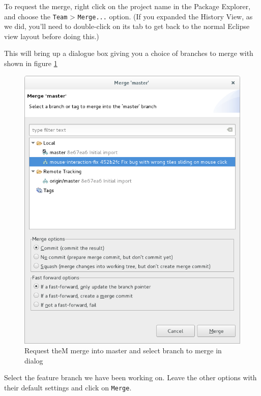 \documentclass[
]{book}
\begin{document}
To request the merge, right click on the project name in the Package Explorer, and choose the \texttt{Team} \textgreater{} \texttt{Merge...} option. (If you expanded the History View, as we did, you'll need to double-click on its tab to get back to the normal Eclipse view layout before doing this.)

This will bring up a dialogue box giving you a choice of branches to merge with shown in figure \ref{fig:requestTheMergeIntoMasterAndSelectbranchToMergeIn-fig}

\begin{figure}

{\centering \includegraphics[width=1\linewidth]{images/requestTheMergeIntoMasterAndSelectbranchToMergeIn} 

}

\caption{Request theM merge into master and select branch to merge in dialog}\label{fig:requestTheMergeIntoMasterAndSelectbranchToMergeIn-fig}
\end{figure}

Select the feature branch we have been working on. Leave the other options with their default settings and click on \texttt{Merge}.
\end{document}
